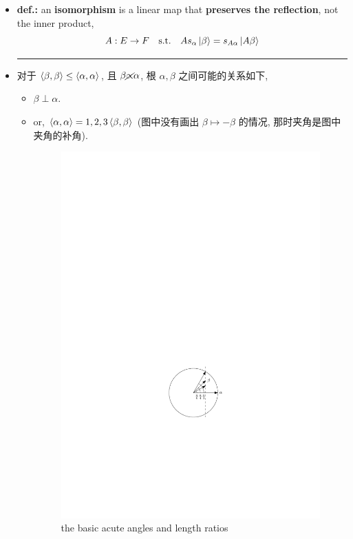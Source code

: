 \begin{itemize}
	\item \textbf{def.:} an \textbf{isomorphism} is a linear map that \textbf{preserves the reflection}, not the inner product,
	\begin{equation}
		A : E \rightarrow F \quad \text{s.t.} \quad A s_\alpha \ket{\beta} = s_{A \alpha} \ket{A \beta}
	\end{equation}
	
	\noindent\rule[0.5ex]{\linewidth}{0.5pt} %
	
	\item 对于 $\braket{\beta, \beta} \leq \braket{\alpha, \alpha}$, 且 $\beta \cancel{\propto} \alpha$, 根 $\alpha, \beta$ 之间可能的关系如下,
	\begin{itemize}
		\item $\beta \perp \alpha$.
		
		\item or, $\braket{\alpha, \alpha} = 1, 2, 3 \braket{\beta, \beta}$ (图中没有画出 $\beta \mapsto - \beta$ 的情况, 那时夹角是图中夹角的补角).
		
		\begin{figure}[H]
			\centering
			\includegraphics[scale=1]{figures/the basic acute angles and length ratios.pdf}
			\caption{the basic acute angles and length ratios}
		\end{figure}
	\end{itemize}
	

\end{itemize}
